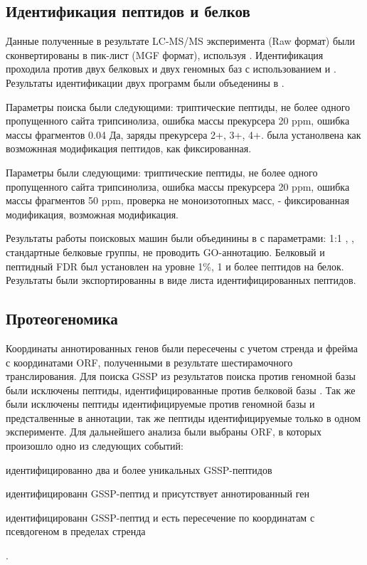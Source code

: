 \subsection{Идентификация пептидов и белков}
Данные полученные в результате LC-MS/MS эксперимента (Raw формат) были сконвертированы в пик-лист (MGF формат), используя  \cite{chambers2012cross}. Идентификация проходила против двух белковых и двух геномных баз с использованием  \cite{cottrell1999probability} и  \cite{fenyo2003method}. Результаты идентификации двух программ были объеденины в . 

Параметры поиска  были следующими: триптические пептиды, не более одного пропущенного сайта трипсинолиза, ошибка массы прекурсера 20 ppm, ошибка массы фрагментов 0.04 Да, заряды прекурсера 2+, 3+, 4+.  была устанолвена как возможнная модификация пептидов,  как фиксированная. 

Параметры  были следующими: триптические пептиды, не более одного пропущенного сайта трипсинолиза, ошибка массы прекурсера 20 ppm, ошибка массы фрагментов 50 ppm, проверка не моноизотопных масс,  - фиксированная модификация,  возможная модификация.

Результаты работы поисковых машин были объединины в  с параметрами: 1:1 , , стандартные белковые группы, не проводить GO-аннотацию. Белковый и пептидный FDR был установлен на уровне 1\%, 1 и более пептидов на белок. Результаты были экспортированны в виде листа идентифицированных пептидов.

\subsection{Протеогеномика }
Координаты аннотированных генов были пересечены с учетом стренда и фрейма с координатами ORF, полученными в результате шестирамочного транслирования.
Для поиска GSSP из результатов поиска против геномной базы  были исключены пептиды, идентифицированные против белковой базы . Так же были исключены пептиды идентифицируемые против геномной базы и предсталвенные в аннотации, так же пептиды идентифицируемые только в одном эксперименте. Для дальнейшего анализа были выбраны ORF, в которых произошло одно из следующих событий:
\begin{inparaenum}
    \item идентифицированно два и более уникальных GSSP-пептидов
    \item идентифицированн GSSP-пептид и присутствует аннотированный ген
    \item идентифицированн GSSP-пептид и есть пересечение по координатам с псевдогеном в пределах стренда
\end{inparaenum}.

